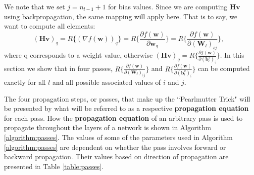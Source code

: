 \documentclass[letterpaper,12pt,titlepage,oneside,final]{book}
\begin{document}
	We note that we set $j = n_{l-1} + 1$ for bias values. Since we are computing $\mathbf{Hv}$ using backpropagation, the same mapping will apply here. That is to say, we want to compute all elements:
	\begin{equation}
	(\mathbf{Hv})_{q} =  R\{(\nabla f(\mathbf{w}))_{q}\} =  R\Big \{\frac{\partial{f(\mathbf{w})}}{\partial{\mathbf{w}_{q}}} \Big \} = R\Big \{\frac{\partial{f(\mathbf{w})}}{\partial{(\mathbf{W}_{l})_{ij}}} \Big \}, 
	\end{equation}
	where q corresponds to a weight value, otherwise $(\mathbf{Hv})_{q} =R\Big \{\frac{\partial{f(\mathbf{w})}}{\partial{(\mathbf{b}_{l}^{v})_{i}}} \Big \}$. In this section we show that in four passes, $R\{\frac{\partial{f(\mathbf{w})}}{\partial{(\mathbf{W}_{l})_{ij}}}\}$ and $R\Big \{\frac{\partial{f(\mathbf{w})}}{\partial{(\mathbf{b}_{l}^{v})_{i}}} \Big \}$ can be computed exactly for all $l$ and all possible associated values of $i$ and $j$. 
	
	The four propagation steps, or passes, that make up the ``Pearlmutter Trick" will be presented by what will be referred to as a respective \textbf{propagation equation} for each pass. How the \textbf{propagation equation} of an arbitrary pass is used to propagate throughout the layers of a network is shown in Algorithm \ref{algorithm:passes}. The values of some of the parameters used in Algorithm \ref{algorithm:passes} are dependent on whether the pass involves forward or backward propagation. Their values based on direction of propagation are presented in Table \ref{table:passes}.
	
\end{document}
